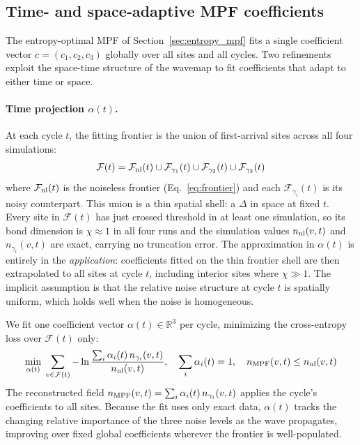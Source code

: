 \documentclass[12pt]{article}
\begin{document}
\subsection{Time- and space-adaptive MPF coefficients}
\label{sec:adaptive_mpf}

The entropy-optimal MPF of Section~\ref{sec:entropy_mpf} fits a single
coefficient vector $c = (c_1, c_2, c_3)$ globally over all sites and all
cycles.
Two refinements exploit the space-time structure of the wavemap to fit
coefficients that adapt to either time or space.

\paragraph{Time projection $\alpha(t)$.}
At each cycle $t$, the fitting frontier is the union of first-arrival sites
across all four simulations:
\begin{equation}
    \mathcal{F}(t) = \mathcal{F}_{\rm nl}(t)
                   \cup \mathcal{F}_{\gamma_1}(t)
                   \cup \mathcal{F}_{\gamma_2}(t)
                   \cup \mathcal{F}_{\gamma_3}(t)
    \label{eq:frontier_union}
\end{equation}
where $\mathcal{F}_{\rm nl}(t)$ is the noiseless frontier (Eq.~\ref{eq:frontier})
and each $\mathcal{F}_{\gamma_i}(t)$ is its noisy counterpart.
This union is a thin spatial shell: a $\Delta$ in space at fixed $t$.
Every site in $\mathcal{F}(t)$ has just crossed threshold in at least one
simulation, so its bond dimension is $\chi\approx1$ in all four runs and
the simulation values $n_{\rm nl}(v,t)$ and $n_{\gamma_i}(v,t)$ are
exact, carrying no truncation error.
The approximation in $\alpha(t)$ is entirely in the \emph{application}:
coefficients fitted on the thin frontier shell are then extrapolated to
all sites at cycle $t$, including interior sites where $\chi \gg 1$.
The implicit assumption is that the relative noise structure at cycle $t$
is spatially uniform, which holds well when the noise is homogeneous.

We fit one coefficient vector $\alpha(t) \in \mathbb{R}^3$ per cycle,
minimizing the cross-entropy loss over $\mathcal{F}(t)$ only:
\begin{equation}
    \min_{\alpha(t)}\; \sum_{v \in \mathcal{F}(t)}
    -\ln \frac{\sum_i \alpha_i(t)\, n_{\gamma_i}(v,t)}{n_{\rm nl}(v,t)},
    \quad \sum_i \alpha_i(t) = 1,\quad
    n_{\rm MPF}(v,t) \leq n_{\rm nl}(v,t)
    \label{eq:alpha_t}
\end{equation}
The reconstructed field $n_{\rm MPF}(v,t) = \sum_i \alpha_i(t)\, n_{\gamma_i}(v,t)$
applies the cycle's coefficients to all sites.
Because the fit uses only exact data, $\alpha(t)$ tracks the changing
relative importance of the three noise levels as the wave propagates,
improving over fixed global coefficients wherever the frontier is
well-populated.
\end{document}
